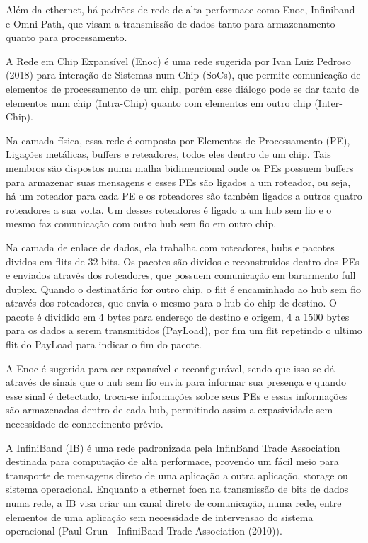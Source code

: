 \documentclass[a4paper,12pt]{article}
\begin{document}
Além da ethernet, há padrões de rede de alta performace como Enoc, Infiniband e Omni Path, que visam a transmissão de dados tanto para armazenamento quanto para processamento.

A Rede em Chip Expansível (Enoc) é uma rede sugerida por Ivan Luiz Pedroso (2018) para interação de Sistemas num Chip (SoCs), que permite comunicação de elementos de processamento de um chip, porém esse diálogo pode se dar tanto de elementos num chip (Intra-Chip) quanto com elementos em outro chip (Inter-Chip).

Na camada física, essa rede é composta por Elementos de Processamento (PE), Ligações metálicas, buffers e reteadores, todos eles dentro de um chip. Tais membros são dispostos numa malha bidimencional onde os PEs possuem buffers para armazenar suas mensagens e esses PEs são ligados a um roteador, ou seja, há um roteador para cada PE e os roteadores são também ligados a outros quatro roteadores a sua volta. Um desses roteadores é ligado a um hub sem fio e o mesmo faz comunicação com outro hub sem fio em outro chip.

Na camada de enlace de dados, ela trabalha com roteadores, hubs e pacotes dividos em flits de 32 bits. Os pacotes são dividos e reconstruidos dentro dos PEs e enviados através dos roteadores, que possuem comunicação em bararmento full duplex. Quando o destinatário for outro chip, o flit é encaminhado ao hub sem fio através dos roteadores, que envia o mesmo para o hub do chip de destino. O pacote é dividido em 4 bytes para endereço de destino e origem, 4 a 1500 bytes para os dados a serem transmitidos (PayLoad), por fim um flit repetindo o ultimo flit do PayLoad para indicar o fim do pacote.

A Enoc é sugerida para ser expansível e reconfigurável, sendo que isso se dá através de sinais que o hub sem fio envia para informar sua presença e quando esse sinal é detectado, troca-se informações sobre seus PEs e essas informações são armazenadas dentro de cada hub, permitindo assim a expasividade sem necessidade de conhecimento prévio.

A InfiniBand (IB) é uma rede padronizada pela InfinBand Trade Association destinada para computação de alta performace, provendo um fácil meio para transporte de mensagens direto de uma aplicação a outra aplicação, storage ou sistema operacional. Enquanto a ethernet foca na transmissão de bits de dados numa rede, a IB visa criar um canal direto de comunicação, numa rede, entre elementos de uma aplicação sem necessidade de intervensao do sistema operacional (Paul Grun - InfiniBand Trade Association (2010)).
\end{document}
